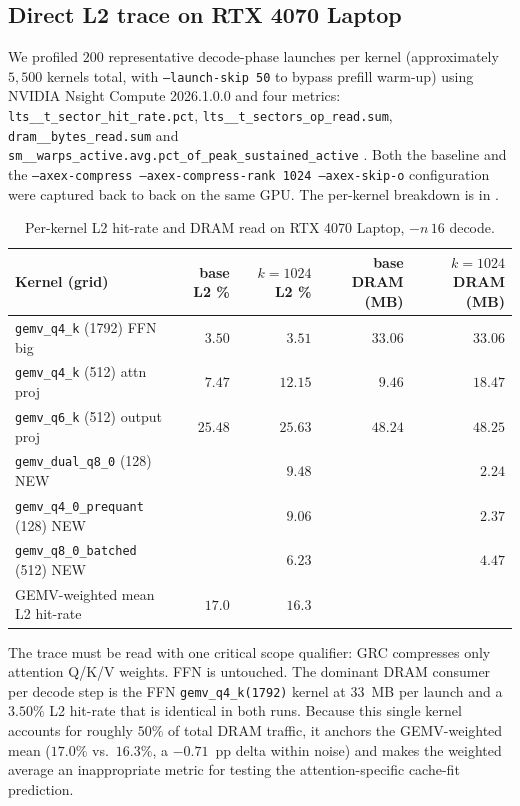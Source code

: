 \documentclass[11pt]{article}
\begin{document}
\subsection{Direct L2 trace on RTX 4070 Laptop}
\label{sec:cachefit-ncu}
We profiled $200$ representative decode-phase launches per kernel
(approximately $5{,}500$ kernels total, with \texttt{--launch-skip 50} to
bypass prefill warm-up) using NVIDIA Nsight Compute 2026.1.0.0 and four
metrics:
\texttt{lts\_\_t\_sector\_hit\_rate.pct},
\texttt{lts\_\_t\_sectors\_op\_read.sum},
\texttt{dram\_\_bytes\_read.sum} and
\texttt{sm\_\_warps\_active.avg.pct\_of\_peak\_sustained\_active}
\cite{nvidia2022nsight}. Both the baseline and the
\texttt{--axex-compress\,--axex-compress-rank\,1024\,--axex-skip-o}
configuration were captured back to back on the same GPU. The per-kernel
breakdown is in .

\begin{table}[h]\centering\footnotesize
\caption{Per-kernel L2 hit-rate and DRAM read on RTX 4070 Laptop, $-n\,16$ decode.}
\label{tab:ncu-l2}
\begin{tabular}{lrrrr}
\toprule
Kernel (grid) & base L2 \% & $k{=}1024$ L2 \% & base DRAM (MB) & $k{=}1024$ DRAM (MB)\\
\midrule
\texttt{gemv\_q4\_k} (1792) FFN big   & $3.50$  & $3.51$  & $33.06$ & $33.06$ \\
\texttt{gemv\_q4\_k} (512) attn proj  & $7.47$  & $12.15$ & $9.46$  & $18.47$ \\
\texttt{gemv\_q6\_k} (512) output proj& $25.48$ & $25.63$ & $48.24$ & $48.25$ \\
\texttt{gemv\_dual\_q8\_0} (128) NEW  &         & $9.48$  &         & $2.24$  \\
\texttt{gemv\_q4\_0\_prequant} (128) NEW &         & $9.06$  &         & $2.37$ \\
\texttt{gemv\_q8\_0\_batched} (512) NEW  &         & $6.23$  &         & $4.47$ \\
\midrule
GEMV-weighted mean L2 hit-rate & $17.0$ & $16.3$ &         &         \\
\bottomrule
\end{tabular}
\end{table}

The trace must be read with one critical scope qualifier: GRC compresses only
attention Q/K/V weights. FFN is untouched. The dominant DRAM consumer per decode
step is the FFN \texttt{gemv\_q4\_k(1792)} kernel at $33$~MB per launch and a
$3.50\%$ L2 hit-rate that is identical in both runs. Because this single
kernel accounts for roughly $50\%$ of total DRAM traffic, it anchors the
GEMV-weighted mean ($17.0\%$ vs.\ $16.3\%$, a $-0.71$~pp delta within noise)
and makes the weighted average an inappropriate metric for testing the
attention-specific cache-fit prediction.
\end{document}
